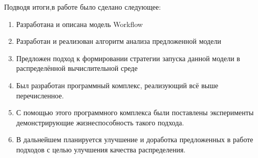 \documentclass[a4paper,14pt]{article}
\begin{document}
Подводя итоги,в работе было сделано следующее:
\begin{enumerate}
\item Разработана и описана модель Workflow
\item Разработан и реализован алгоритм анализа предложенной модели
\item Предложен подход к формировании стратегии запуска данной модели в распределённой вычислительной среде
\item Был разработан программный комплекс, реализующий всё выше перечисленное.
\item С помощью этого программного комплекса были поставлены эксперименты демонстрирующие жизнеспособность такого подхода.
\item  В дальнейшем планируется улучшение и доработка предложенных в работе подходов с целью улучшения качества распределения. 
\end{enumerate} 



%
%
%
%
%
\end{document}
